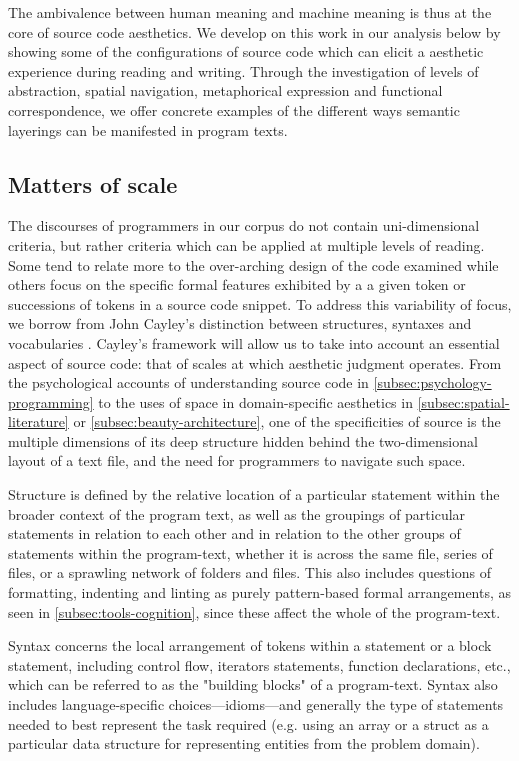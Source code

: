 The ambivalence between human meaning and machine meaning is thus at the core of source code aesthetics. We develop on this work in our analysis below by showing some of the configurations of source code which can elicit a aesthetic experience during reading and writing. Through the investigation of levels of abstraction, spatial navigation, metaphorical expression and functional correspondence, we offer concrete examples of the different ways semantic layerings can be manifested in program texts.

\subsection{Matters of scale}
\label{subsec:matters-of-scale}

The discourses of programmers in our corpus do not contain uni-dimensional criteria, but rather criteria which can be applied at multiple levels of reading. Some tend to relate more to the over-arching design of the code examined while others focus on the specific formal features exhibited by a a given token or successions of tokens in a source code snippet. To address this variability of focus, we borrow from John Cayley's distinction between structures, syntaxes and vocabularies \citep{cayley_code_2012}.  Cayley's framework will allow us to take into account an essential aspect of source code: that of scales at which aesthetic judgment operates. From the psychological accounts of understanding source code in \ref{subsec:psychology-programming} to the uses of space in domain-specific aesthetics in \ref{subsec:spatial-literature} or \ref{subsec:beauty-architecture}, one of the specificities of source is the multiple dimensions of its deep structure hidden behind the two-dimensional layout of a text file, and the need for programmers to navigate such space.

Structure is defined by the relative location of a particular statement within the broader context of the program text, as well as the groupings of particular statements in relation to each other and in relation to the other groups of statements within the program-text, whether it is across the same file, series of files, or a sprawling network of folders and files. This also includes questions of formatting, indenting and linting as purely pattern-based formal arrangements, as seen in \ref{subsec:tools-cognition}, since these affect the whole of the program-text.

Syntax concerns the local arrangement of tokens within a statement or a block statement, including control flow, iterators statements, function declarations, etc., which can be referred to as the "building blocks" of a program-text. Syntax also includes language-specific choices—idioms—and generally the type of statements needed to best represent the task required (e.g. using an array or a struct as a particular data structure for representing entities from the problem domain).


